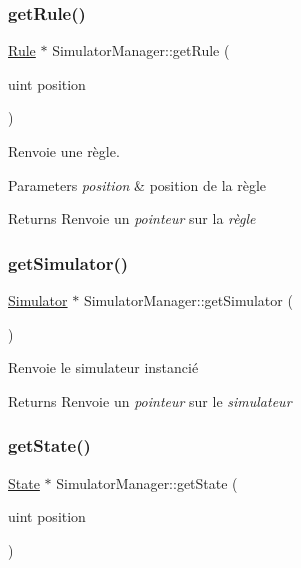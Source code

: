 \subsubsection{\texorpdfstring{get\+Rule()}{getRule()}}
{\footnotesize\ttfamily \mbox{\hyperlink{class_rule}{Rule}} $\ast$ Simulator\+Manager\+::get\+Rule (\begin{DoxyParamCaption}\item[{uint}]{position }\end{DoxyParamCaption})}



Renvoie une règle. 


\begin{DoxyParams}{Parameters}
{\em position} & position de la règle \\
\hline
\end{DoxyParams}
\begin{DoxyReturn}{Returns}
Renvoie un {\itshape pointeur} sur la {\itshape règle} 
\end{DoxyReturn}
\mbox{\label{class_simulator_manager_aa540cc8716a5fc14dd7f920d554d7828}} 
\subsubsection{\texorpdfstring{get\+Simulator()}{getSimulator()}}
{\footnotesize\ttfamily \mbox{\hyperlink{class_simulator}{Simulator}} $\ast$ Simulator\+Manager\+::get\+Simulator (\begin{DoxyParamCaption}{ }\end{DoxyParamCaption})}



Renvoie le simulateur instancié 

\begin{DoxyReturn}{Returns}
Renvoie un {\itshape pointeur} sur le {\itshape simulateur} 
\end{DoxyReturn}
\mbox{\label{class_simulator_manager_a54c020cc0735a41d4ed14e83d5b073c7}} 
\subsubsection{\texorpdfstring{get\+State()}{getState()}\hspace{0.1cm}{\footnotesize\ttfamily [1/2]}}
{\footnotesize\ttfamily \mbox{\hyperlink{class_state}{State}} $\ast$ Simulator\+Manager\+::get\+State (\begin{DoxyParamCaption}\item[{uint}]{position }\end{DoxyParamCaption})}



